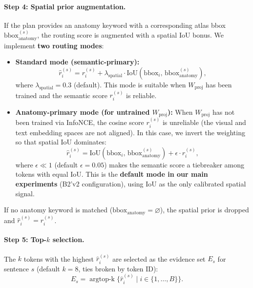 \documentclass[11pt,a4paper]{article}
\begin{document}
\paragraph{Step 4: Spatial prior augmentation.}
If the plan provides an anatomy keyword with a corresponding atlas bbox $\mathrm{bbox}_{\mathrm{anatomy}}^{(s)}$, the routing score is augmented with a spatial IoU bonus.
We implement \textbf{two routing modes}:

\begin{itemize}[nosep]
\item \textbf{Standard mode (semantic-primary):}
\begin{equation}
\hat{r}_i^{(s)} = r_i^{(s)} + \lambda_{\mathrm{spatial}} \cdot \mathrm{IoU}(\mathrm{bbox}_i, \, \mathrm{bbox}_{\mathrm{anatomy}}^{(s)}),
\label{eq:spatial_routing}
\end{equation}
where $\lambda_{\mathrm{spatial}} = 0.3$ (default). This mode is suitable when $W_{\mathrm{proj}}$ has been trained and the semantic score $r_i^{(s)}$ is reliable.

\item \textbf{Anatomy-primary mode (for untrained $W_{\mathrm{proj}}$):}
When $W_{\mathrm{proj}}$ has not been trained via InfoNCE, the cosine score $r_i^{(s)}$ is unreliable (the visual and text embedding spaces are not aligned).
In this case, we invert the weighting so that spatial IoU dominates:
\begin{equation}
\hat{r}_i^{(s)} = \mathrm{IoU}(\mathrm{bbox}_i, \, \mathrm{bbox}_{\mathrm{anatomy}}^{(s)}) + \epsilon \cdot r_i^{(s)},
\label{eq:anatomy_primary}
\end{equation}
where $\epsilon \ll 1$ (default $\epsilon = 0.05$) makes the semantic score a tiebreaker among tokens with equal IoU.
This is the \textbf{default mode in our main experiments} (B2'v2 configuration), using IoU as the only calibrated spatial signal.
\end{itemize}

If no anatomy keyword is matched ($\mathrm{bbox}_{\mathrm{anatomy}} = \varnothing$), the spatial prior is dropped and $\hat{r}_i^{(s)} = r_i^{(s)}$.

\paragraph{Step 5: Top-$k$ selection.}
The $k$ tokens with the highest $\hat{r}_i^{(s)}$ are selected as the evidence set $E_s$ for sentence $s$ (default $k{=}8$, ties broken by token ID):
\begin{equation}
E_s = \operatorname{argtop\text{-}k}\bigl\{\hat{r}_i^{(s)} \mid i \in \{1,\ldots,B\}\bigr\}.
\label{eq:topk}
\end{equation}
\end{document}
